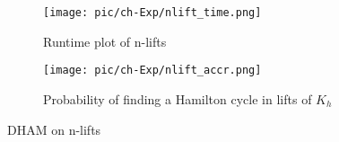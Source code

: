 \begin{figure}[ht]

\begin{subfigure}{\textwidth}
\centering
\texttt{[image: pic/ch-Exp/nlift\_time.png]}
\caption{Runtime plot of n-lifts}
\label{fig:nlift:time}
\end{subfigure}
\begin{subfigure}{\textwidth}
\centering
\texttt{[image: pic/ch-Exp/nlift\_accr.png]}
\caption{Probability of finding a Hamilton cycle in lifts of $K_h$}
\label{fig:lift:accr}
\end{subfigure}

\caption{DHAM on n-lifts}
\label{fig:other:plots}
\end{figure}